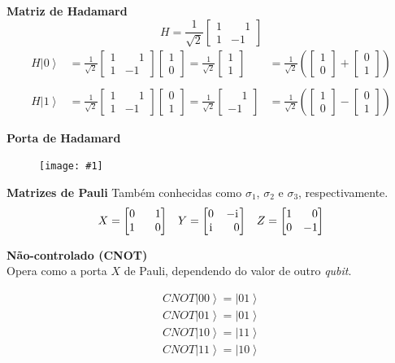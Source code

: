 \documentclass[t]{beamer}
\newcommand{\ii}{
	\rm{i}
}
\newcommand{\vetor}[2]{\ensuremath{
\left[\begin{matrix}
#1 \\
#2
\end{matrix}\right]
}
}
\newcommand{\matriz}[4]{\ensuremath{
\left[\begin{matrix}
#1 & #2 \\
#3 & #4 
\end{matrix}\right]
}
}
\newcommand{\ket}[1]{\ensuremath{\left|#1\right\rangle}}
\newcommand{\imgw}[2]{%
\begin{center}
	\begin{figure}
	\texttt{[image: \#1]}\\
	\end{figure}
\end{center}
}
\newcommand{\ps}{
	\phantom{-}
}
\newcommand{\HH}{\ensuremath{
	\frac{1}{\sqrt{2}}\matriz{1}{\ps 1}{1}{-1}
}}
\newcommand{\XX}{\ensuremath{
	\matriz{0}{\ps 1}{1}{\ps 0}
}}
\newcommand{\YY}{\ensuremath{
	\matriz{0}{-\ii}{\ii}{\ps 0}
}}
\newcommand{\ZZ}{\ensuremath{
	\matriz{1}{\ps 0}{0}{-1}
}}
\begin{document}
	\begin{frame}{\subsecname}
		\textbf{Matriz de Hadamard}\\
		$$H = \HH$$
		\begin{align*}
			H\ket{0} &= \HH \vetor{1}{0} = \frac{1}{\sqrt{2}}\vetor{1}{1} &= \frac{1}{\sqrt{2}} \left(\vetor{1}{0} + \vetor{0}{1}\right)\\
			~\\
			H\ket{1} &= \HH \vetor{0}{1} = \frac{1}{\sqrt{2}}\vetor{\ps 1}{-1} &= \frac{1}{\sqrt{2}} \left(\vetor{1}{0} - \vetor{0}{1}\right)
		\end{align*}
	\end{frame}
	
	\begin{frame}{\subsecname}
		\textbf{Porta de Hadamard}\\			
				
		\imgw{H-gate.pdf}{8cm}		
	\end{frame}
	
	\begin{frame}{\subsecname}
		\textbf{Matrizes de Pauli}
		Também conhecidas como $\sigma_1$, $\sigma_2$ e $\sigma_3$, respectivamente.
		\begin{align*}
		X = \XX && Y = \YY && Z = \ZZ
		\end{align*}
		
		\begin{overprint}
			\onslide<2>{
				\begin{align*}
				X \ket{0} &= \XX \vetor{1}{0} = \vetor{0}{1} = \ket{1}\\
				X \ket{1} &= \XX \vetor{0}{1} = \vetor{1}{0} = \ket{0}
				\end{align*}							
			}
		\end{overprint}		
		
	\end{frame}
	
	\begin{frame}{\subsecname}
	
		\textbf{Não-controlado (CNOT)}\\
		
		Opera como a porta $X$ de Pauli, dependendo do valor de outro \textit{qubit}.
		
		\begin{align*}
			CNOT \ket{00} = \ket{01}\\
			CNOT \ket{01} = \ket{01}\\
			CNOT \ket{10} = \ket{11}\\
			CNOT \ket{11} = \ket{10}\\
		\end{align*}
	
	\end{frame}
	
\end{document}
